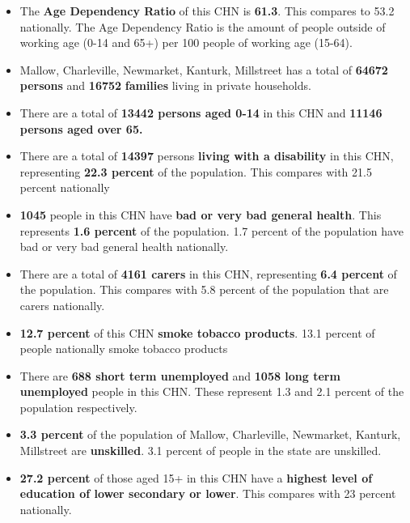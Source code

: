 \documentclass{article}
\begin{document}
\begin{itemize}

\item The \textbf{Age Dependency Ratio} of this CHN is  \textbf{61.3}. This compares to 53.2 nationally. The Age Dependency Ratio is the amount of people outside of working age (0-14 and 65+) per 100 people of working age (15-64). 

\item Mallow, Charleville, Newmarket, Kanturk, Millstreet has a total of \textbf{\num{64672}} \textbf{persons} and  \textbf{\num{16752}} \textbf{families} living in private households.

\item There are a total of \textbf{\num{13442} persons aged 0-14} in this CHN and \textbf{\num{11146} persons aged over 65.} 

\item There are a total of \textbf{\num{14397}} persons \textbf{living with a disability} in this CHN, representing \textbf{22.3 percent} of the population. This compares with  21.5 percent nationally

\item \textbf{\num{1045}} people in this CHN have \textbf{bad or very bad general health}. This represents \textbf{1.6 percent} of the population. 1.7 percent of the population have bad or very bad general health nationally. 

\item There are a total of \textbf{\num{4161} carers} in this CHN, representing \textbf{6.4 percent} of the population. This compares with 5.8 percent of the population that are carers nationally. 

\item \textbf{12.7 percent} of this CHN \textbf{smoke tobacco products}. 13.1 percent of people nationally smoke tobacco products

\item There are \textbf{\num{688} short term unemployed} and \textbf{\num{1058} long term unemployed} people in this CHN. These represent 1.3 and 2.1 percent of the population respectively.

\item  \textbf{3.3 percent} of the population of Mallow, Charleville, Newmarket, Kanturk, Millstreet are \textbf{unskilled}. 3.1 percent of people in the state are unskilled.

\item \textbf{27.2 percent} of those aged 15+ in this CHN have a \textbf{highest level of education of lower secondary or lower}. This compares with 23 percent nationally. 


\end{itemize}
\end{document}
